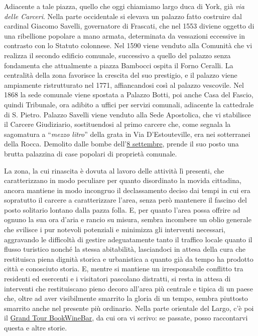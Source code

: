 \documentclass[
  letterpaper,
  DIV=11,
  numbers=noendperiod]{scrartcl}
\begin{document}
Adiacente a tale piazza, quello che oggi chiamiamo largo duca di York,
già \emph{via delle Carceri}. Nella parte occidentale si elevava un
palazzo fatto costruire dal cardinal Giacomo Savelli, governatore di
Frascati, che nel 1553 diviene oggetto di una ribellione popolare a mano
armata, determinata da vessazioni eccessive in contrasto con lo Statuto
colonnese. Nel 1590 viene venduto alla Comunità che vi realizza il
secondo edificio comunale, successivo a quello del palazzo senza
fondamenta che attualmente a piazza Bambocci ospita il Forno Ceralli. La
centralità della zona favorisce la crescita del suo prestigio, e il
palazzo viene ampiamente ristrutturato nel 1771, affiancandosi così al
palazzo vescovile. Nel 1868 la sede comunale viene spostata a Palazzo
Botti, poi anche Casa del Fascio, quindi Tribunale, ora adibito a uffici
per servizi comunali, adiacente la cattedrale di S. Pietro. Palazzo
Savelli viene venduto alla Sede Apostolica, che vi stabilisce il Carcere
Giudiziario, sostituendosi al primo carcere che, come segnala la
sagomatura a ``\emph{mezzo litro}'' della grata in Via D'Estouteville,
era nei sotterranei della Rocca. Demolito dalle bombe
dell'\hyperref[0]{8 settembre}, prende il suo posto una brutta palazzina
di case popolari di proprietà comunale.

La zona, la cui rinascita è dovuta al lavoro delle attività lì presenti,
che caratterizzano in modo peculiare per quanto disordinato la movida
cittadina, ancora mantiene in modo incongruo il declassamento deciso dai
tempi in cui era sopratutto il carcere a caratterizzare l'area, senza
però mantenere il fascino del posto solitario lontano dalla pazza folla.
E, per quanto l'area possa offrire ad ognuno la sua ora d'aria e rancio
su misura, sembra incombere un oblio generale che svilisce i pur
notevoli potenziali e minimizza gli interventi necessari, aggravando le
difficoltà di gestire adeguatamente tanto il traffico locale quanto il
flusso turistico nonché la stessa abitabilità, lasciandoci in attesa
della cura che restituisca piena dignità storica e urbanistica a quanto
già da tempo ha prodotto città e conosciuto storia. E, mentre si
mantiene un irresponsabile conflitto tra residenti ed esercenti e i
visitatori pascolano distratti, si resta in attesa di interventi che
restituiscano pieno decoro all'area più centrale e tipica di un paese
che, oltre ad aver visibilmente smarrito la gloria di un tempo, sembra
piuttosto smarrito anche nel presente più ordinario. Nella parte
orientale del Largo, c'è poi il \hyperref[0]{Grand Tour BookWineBar}, da
cui ora vi scrivo: se passate, posso raccontarvi questa e altre storie.
\end{document}

